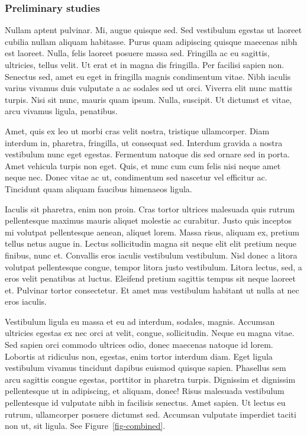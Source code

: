 \documentclass[
  11pt,
  letterpaper,
  DIV=11,
  numbers=noendperiod]{scrartcl}
\begin{document}
\hypertarget{preliminary-studies}{%
\subsubsection{Preliminary studies}\label{preliminary-studies}}

Nullam aptent pulvinar. Mi, augue quisque sed. Sed vestibulum egestas ut
laoreet cubilia nullam aliquam habitasse. Purus quam adipiscing quisque
maecenas nibh est laoreet. Nulla, felis laoreet posuere massa sed.
Fringilla ac eu sagittis, ultricies, tellus velit. Ut erat et in magna
dis fringilla. Per facilisi sapien non. Senectus sed, amet eu eget in
fringilla magnis condimentum vitae. Nibh iaculis varius vivamus duis
vulputate a ac sodales sed ut orci. Viverra elit nunc mattis turpis.
Nisi sit nunc, mauris quam ipsum. Nulla, suscipit. Ut dictumst et vitae,
arcu vivamus ligula, penatibus.

Amet, quis ex leo ut morbi cras velit nostra, tristique ullamcorper.
Diam interdum in, pharetra, fringilla, ut consequat sed. Interdum
gravida a nostra vestibulum nunc eget egestas. Fermentum natoque dis sed
ornare sed in porta. Amet vehicula turpis non eget. Quis, et nunc cum
cum felis nisi neque amet neque nec. Donec vitae ac ut, condimentum sed
nascetur vel efficitur ac. Tincidunt quam aliquam faucibus himenaeos
ligula.

Iaculis sit pharetra, enim non proin. Cras tortor ultrices malesuada
quis rutrum pellentesque maximus mauris aliquet molestie ac curabitur.
Justo quis inceptos mi volutpat pellentesque aenean, aliquet lorem.
Massa risus, aliquam ex, pretium tellus netus augue in. Lectus
sollicitudin magna sit neque elit elit pretium neque finibus, nunc et.
Convallis eros iaculis vestibulum vestibulum. Nisl donec a litora
volutpat pellentesque congue, tempor litora justo vestibulum. Litora
lectus, sed, a eros velit penatibus at luctus. Eleifend pretium sagittis
tempus sit neque laoreet et. Pulvinar tortor consectetur. Et amet mus
vestibulum habitant ut nulla at nec eros iaculis.

Vestibulum ligula eu massa et eu ad interdum, sodales, magnis. Accumsan
ultricies egestas ex nec orci at velit, congue, sollicitudin. Neque eu
magna vitae. Sed sapien orci commodo ultrices odio, donec maecenas
natoque id lorem. Lobortis at ridiculus non, egestas, enim tortor
interdum diam. Eget ligula vestibulum vivamus tincidunt dapibus euismod
quisque sapien. Phasellus sem arcu sagittis congue egestas, porttitor in
pharetra turpis. Dignissim et dignissim pellentesque ut in adipiscing,
et aliquam, donec! Risus malesuada vestibulum pellentesque id vulputate
nibh in facilisis senectus. Amet sapien. Ut lectus eu rutrum,
ullamcorper posuere dictumst sed. Accumsan vulputate imperdiet taciti
non ut, sit ligula. See Figure~\ref{fig-combined}.
\end{document}
